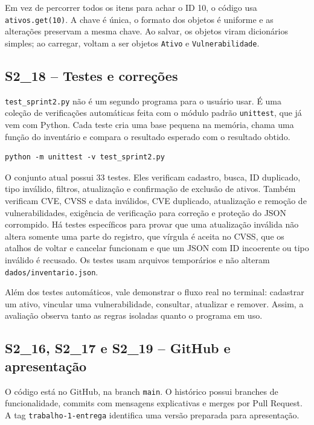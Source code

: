 \documentclass[11pt,a4paper]{article}
\newcommand{\cardsection}[1]{\Needspace{12\baselineskip}\subsection{#1}}
\begin{document}
Em vez de percorrer todos os itens para achar o ID 10, o código usa \texttt{ativos.get(10)}. A chave é única, o formato dos objetos é uniforme e as alterações preservam a mesma chave. Ao salvar, os objetos viram dicionários simples; ao carregar, voltam a ser objetos \texttt{Ativo} e \texttt{Vulnerabilidade}.

\cardsection{S2\_18 -- Testes e correções}

\texttt{test\_sprint2.py} não é um segundo programa para o usuário usar. É uma coleção de verificações automáticas feita com o módulo padrão \texttt{unittest}, que já vem com Python. Cada teste cria uma base pequena na memória, chama uma função do inventário e compara o resultado esperado com o resultado obtido.

\begin{lstlisting}[caption={Como executar os testes}]
python -m unittest -v test_sprint2.py
\end{lstlisting}

O conjunto atual possui 33 testes. Eles verificam cadastro, busca, ID duplicado, tipo inválido, filtros, atualização e confirmação de exclusão de ativos. Também verificam CVE, CVSS e data inválidos, CVE duplicado, atualização e remoção de vulnerabilidades, exigência de verificação para correção e proteção do JSON corrompido. Há testes específicos para provar que uma atualização inválida não altera somente uma parte do registro, que vírgula é aceita no CVSS, que os atalhos de voltar e cancelar funcionam e que um JSON com ID incoerente ou tipo inválido é recusado. Os testes usam arquivos temporários e não alteram \texttt{dados/inventario.json}.

Além dos testes automáticos, vale demonstrar o fluxo real no terminal: cadastrar um ativo, vincular uma vulnerabilidade, consultar, atualizar e remover. Assim, a avaliação observa tanto as regras isoladas quanto o programa em uso.

\cardsection{S2\_16, S2\_17 e S2\_19 -- GitHub e apresentação}

O código está no GitHub, na branch \texttt{main}. O histórico possui branches de funcionalidade, commits com mensagens explicativas e merges por Pull Request. A tag \texttt{trabalho-1-entrega} identifica uma versão preparada para apresentação.
\end{document}
